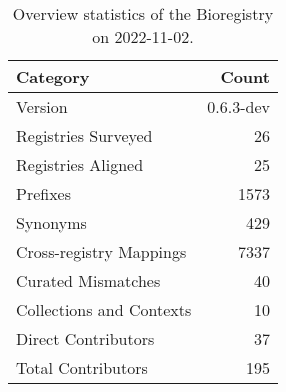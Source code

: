 \begin{table}
\centering
\caption{Overview statistics of the Bioregistry on 2022-11-02.}
\label{tab:bioregistry-summary}
\begin{tabular}{lr}
\toprule
                Category &     Count \\
\midrule
                 Version & 0.6.3-dev \\
     Registries Surveyed &        26 \\
      Registries Aligned &        25 \\
                Prefixes &      1573 \\
                Synonyms &       429 \\
 Cross-registry Mappings &      7337 \\
      Curated Mismatches &        40 \\
Collections and Contexts &        10 \\
     Direct Contributors &        37 \\
      Total Contributors &       195 \\
\bottomrule
\end{tabular}
\end{table}
